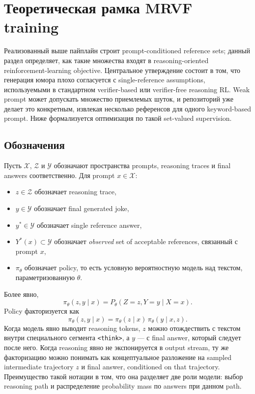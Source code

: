 \section{Теоретическая рамка MRVF training}

Реализованный выше пайплайн строит prompt-conditioned reference sets; данный раздел определяет, как такие множества входят в reasoning-oriented reinforcement-learning objective. Центральное утверждение состоит в том, что генерация юмора плохо согласуется с single-reference assumptions, используемыми в стандартном verifier-based или verifier-free reasoning RL. Weak prompt может допускать множество приемлемых шуток, и репозиторий уже делает это конкретным, извлекая несколько референсов для одного keyword-based prompt. Ниже формализуется оптимизация по такой set-valued supervision.

\subsection{Обозначения}

Пусть \(\mathcal{X}\), \(\mathcal{Z}\) и \(\mathcal{Y}\) обозначают пространства prompts, reasoning traces и final answers соответственно. Для prompt \(x\in\mathcal{X}\):
\begin{itemize}
    \item \(z\in\mathcal{Z}\) обозначает reasoning trace,
    \item \(y\in\mathcal{Y}\) обозначает final generated joke,
    \item \(y^{*}\in\mathcal{Y}\) обозначает single reference answer,
    \item \(Y^{*}(x)\subset\mathcal{Y}\) обозначает \emph{observed} set of acceptable references, связанный с prompt \(x\),
    \item \(\pi_{\theta}\) обозначает policy, то есть условную вероятностную модель над текстом, параметризованную \(\theta\).
\end{itemize}

Более явно,
\[
    \pi_{\theta}(z,y\mid x)=P_{\theta}(Z=z,Y=y\mid X=x).
\]
Policy факторизуется как
\[
    \pi_{\theta}(z,y\mid x)=\pi_{\theta}(z\mid x)\,\pi_{\theta}(y\mid x,z).
\]
Когда модель явно выводит reasoning tokens, \(z\) можно отождествить с текстом внутри специального сегмента \texttt{<think>}, а \(y\) --- с final answer, который следует после него. Когда reasoning явно не экспонируется в output stream, ту же факторизацию можно понимать как концептуальное разложение на sampled intermediate trajectory \(z\) и final answer, conditioned on that trajectory. Преимущество такой нотации в том, что она разделяет две роли модели: выбор reasoning path и распределение probability mass по answers при данном path.

